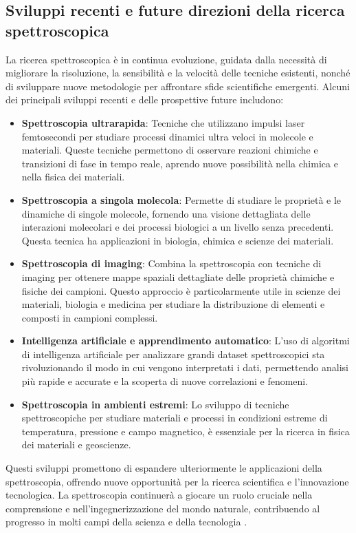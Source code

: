 \documentclass[12pt,a4paper]{report}
\begin{document}
\subsection{Sviluppi recenti e future direzioni della ricerca spettroscopica}

La ricerca spettroscopica è in continua evoluzione, guidata dalla necessità di migliorare la risoluzione, la sensibilità e la velocità delle tecniche esistenti, nonché di sviluppare nuove metodologie per affrontare sfide scientifiche emergenti. Alcuni dei principali sviluppi recenti e delle prospettive future includono:

\begin{itemize}
\item \textbf{Spettroscopia ultrarapida}: Tecniche che utilizzano impulsi laser femtosecondi per studiare processi dinamici ultra veloci in molecole e materiali. Queste tecniche permettono di osservare reazioni chimiche e transizioni di fase in tempo reale, aprendo nuove possibilità nella chimica e nella fisica dei materiali.
\item \textbf{Spettroscopia a singola molecola}: Permette di studiare le proprietà e le dinamiche di singole molecole, fornendo una visione dettagliata delle interazioni molecolari e dei processi biologici a un livello senza precedenti. Questa tecnica ha applicazioni in biologia, chimica e scienze dei materiali.
\item \textbf{Spettroscopia di imaging}: Combina la spettroscopia con tecniche di imaging per ottenere mappe spaziali dettagliate delle proprietà chimiche e fisiche dei campioni. Questo approccio è particolarmente utile in scienze dei materiali, biologia e medicina per studiare la distribuzione di elementi e composti in campioni complessi.
\item \textbf{Intelligenza artificiale e apprendimento automatico}: L'uso di algoritmi di intelligenza artificiale per analizzare grandi dataset spettroscopici sta rivoluzionando il modo in cui vengono interpretati i dati, permettendo analisi più rapide e accurate e la scoperta di nuove correlazioni e fenomeni.
\item \textbf{Spettroscopia in ambienti estremi}: Lo sviluppo di tecniche spettroscopiche per studiare materiali e processi in condizioni estreme di temperatura, pressione e campo magnetico, è essenziale per la ricerca in fisica dei materiali e geoscienze.
\end{itemize}

Questi sviluppi promettono di espandere ulteriormente le applicazioni della spettroscopia, offrendo nuove opportunità per la ricerca scientifica e l'innovazione tecnologica. La spettroscopia continuerà a giocare un ruolo cruciale nella comprensione e nell'ingegnerizzazione del mondo naturale, contribuendo al progresso in molti campi della scienza e della tecnologia \cite{johnson2020future}.
\end{document}

